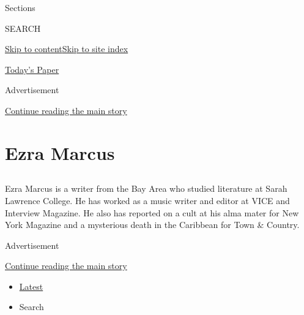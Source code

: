Sections

SEARCH

\protect\hyperlink{site-content}{Skip to
content}\protect\hyperlink{site-index}{Skip to site index}

\href{https://myaccount.nytimes3xbfgragh.onion/auth/login?response_type=cookie\&client_id=vi}{}

\href{https://www.nytimes3xbfgragh.onion/section/todayspaper}{Today's
Paper}

Advertisement

\protect\hyperlink{after-top}{Continue reading the main story}

\hypertarget{ezra-marcus}{%
\section{Ezra Marcus}\label{ezra-marcus}}

\subsection{}

Ezra Marcus is a writer from the Bay Area who studied literature at
Sarah Lawrence College. He has worked as a music writer and editor at
VICE and Interview Magazine. He also has reported on a cult at his alma
mater for New York Magazine and a mysterious death in the Caribbean for
Town \& Country.

Advertisement

\protect\hyperlink{after-mid1}{Continue reading the main story}

\begin{itemize}
\tightlist
\item
  \protect\hyperlink{stream-panel}{Latest}
\item
  Search
\end{itemize}

